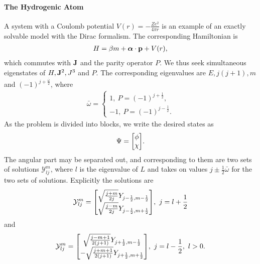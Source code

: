 \paragraph{The Hydrogenic Atom}
A system with a Coulomb potential $V(r) = -\frac{Ze^{2}}{4\pi r}$ is an example of an exactly solvable model with the Dirac formalism. The corresponding Hamiltonian is
\begin{align*}
	H = \beta m + \vb*{\alpha}\cdot\vb{p} + V(r),
\end{align*}
which commutes with $\vb{J}$ and the parity operator $P$. We thus seek simultaneous eigenstates of $H, \vb{J}^{2}, J^{3}$ and $P$. The corresponding eigenvalues are $E, j(j + 1), m$ and $(-1)^{j + \frac{\bar{\omega}}{2}}$, where
\begin{align*}
	\bar{\omega} =
	\begin{cases}
		 1,\ P = (-1)^{j + \frac{1}{2}}, \\
		-1,\ P = (-1)^{j - \frac{1}{2}}.
	\end{cases}
\end{align*}
As the problem is divided into blocks, we write the desired states as
\begin{align*}
	\Psi = 
	\mqty[
		\phi \\
		\chi
	].
\end{align*}
The angular part may be separated out, and corresponding to them are two sets of solutions $\mathcal{Y}^{m}_{lj}$, where $l$ is the eigenvalue of $L$ and takes on values $j \pm \frac{1}{2}\bar{\omega}$ for the two sets of solutions. Explicitly the solutions are
\begin{align*}
	\mathcal{Y}^{m}_{lj} =
	\mqty[
		\sqrt{\frac{j + m}{2j}}Y_{j - \frac{1}{2}, m - \frac{1}{2}} \\
		\sqrt{\frac{j - m}{2j}}Y_{j - \frac{1}{2}, m + \frac{1}{2}}
	],\ j = l + \frac{1}{2}
\end{align*}
and
\begin{align*}
	\mathcal{Y}^{m}_{lj} =
	\mqty[
		\sqrt{\frac{j - m + 1}{2(j + 1)}}Y_{j + \frac{1}{2}, m - \frac{1}{2}} \\
		-\sqrt{\frac{j + m + 1}{2(j + 1)}}Y_{j + \frac{1}{2}, m + \frac{1}{2}}
	],\ j = l - \frac{1}{2},\ l > 0.
\end{align*}


